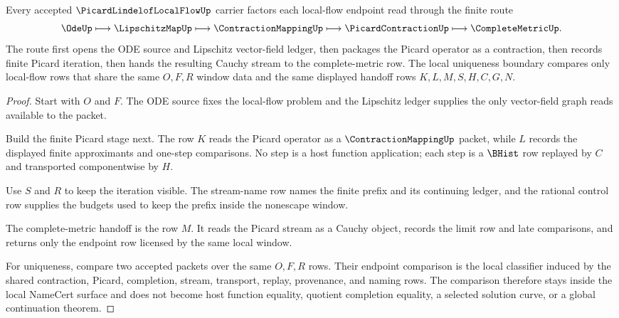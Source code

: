\begin{theorem}
\label{thm:picard-lindelof-local-flow-picard-handoff}
Every accepted $\PicardLindelofLocalFlowUp$ carrier factors each local-flow endpoint read through the finite route
$$
\OdeUp \longmapsto \LipschitzMapUp \longmapsto \ContractionMappingUp \longmapsto \PicardContractionUp \longmapsto \CompleteMetricUp.
$$
The route first opens the ODE source and Lipschitz vector-field ledger, then packages the Picard operator as a contraction, then records finite Picard iteration, then hands the resulting Cauchy stream to the complete-metric row. The local uniqueness boundary compares only local-flow rows that share the same $O,F,R$ window data and the same displayed handoff rows $K,L,M,S,H,C,G,N$.
\end{theorem}
\begin{proof}
Start with $O$ and $F$. The ODE source fixes the local-flow problem and the Lipschitz ledger supplies the only vector-field graph reads available to the packet.

Build the finite Picard stage next. The row $K$ reads the Picard operator as a $\ContractionMappingUp$ packet, while $L$ records the displayed finite approximants and one-step comparisons. No step is a host function application; each step is a $\BHist$ row replayed by $C$ and transported componentwise by $H$.

Use $S$ and $R$ to keep the iteration visible. The stream-name row names the finite prefix and its continuing ledger, and the rational control row supplies the budgets used to keep the prefix inside the nonescape window.

The complete-metric handoff is the row $M$. It reads the Picard stream as a Cauchy object, records the limit row and late comparisons, and returns only the endpoint row licensed by the same local window.

For uniqueness, compare two accepted packets over the same $O,F,R$ rows. Their endpoint comparison is the local classifier induced by the shared contraction, Picard, completion, stream, transport, replay, provenance, and naming rows. The comparison therefore stays inside the local NameCert surface and does not become host function equality, quotient completion equality, a selected solution curve, or a global continuation theorem.
\end{proof}


